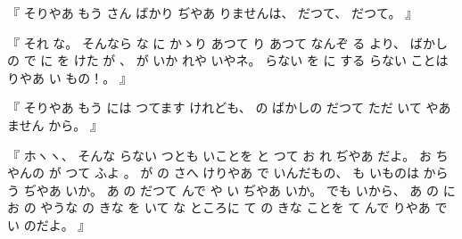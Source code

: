 %
『
そりやあ
もう
さん
ばかり
ぢやあ
りませんは、
%
だつて、
%
だつて。
』

%
『
それ
な。
%
そんなら
な
に
かゝり
あつて
り
あつて
なんぞ
る
より、
%
ばかしの
で%
に
を
けた
が
、
%
%
が
いか
れや
いやネ。
%
らない
を
に
する
らない
ことは
りやあ
い
もの！。
』

%
『
そりやあ
もう
には
つてます
けれども、
%
の
ばかしの
だつて
ただ%
いて
やあ
ません
から。
』

%
『
ホヽヽ、
%
そんな
らない
つとも
いことを
と
つて
お
れ
ぢやあ
だよ。
%
お
ちやんの
が
つて
ふよ
。
%
%
が
の
さへ
けりやあ
で
いんだもの、
%
も
いものは
からう
ぢやあ
いか。
%
あ
の
だつて
んで
や
い
ぢやあ
いか。
%
でも
いから、
%
あ
の
に
お
の
やうな
%
の
きな
を
いて
%
な
ところに
て
%
の
きな
ことを
て
んで
りやあ
で
い
のだよ。
』
